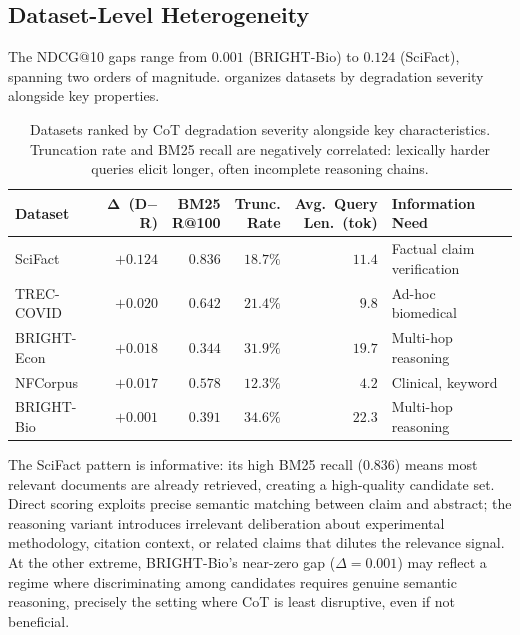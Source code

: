 \documentclass[12pt]{article}
\makeatletter
\newcommand{\ndcg}{NDCG@10}
\newcommand{\CoT}{CoT}
\makeatother
\begin{document}
\subsection{Dataset-Level Heterogeneity}
\label{sec:dataset_heterogeneity}

The \ndcg{} gaps range from $0.001$ (BRIGHT-Bio) to $0.124$ (SciFact), spanning
two orders of magnitude.   organizes datasets
by degradation severity alongside key properties.

\begin{table}[htbp]
\caption{Datasets ranked by \CoT{} degradation severity alongside key
         characteristics.  Truncation rate and BM25 recall are negatively
         correlated: lexically harder queries elicit longer, often incomplete
         reasoning chains.}
\label{tab:dataset_characterization}
\centering
\small
\setlength{\tabcolsep}{6pt}
\renewcommand{\arraystretch}{1.3}
\begin{tabular}{@{}l r r r r l@{}}
\toprule
\textbf{Dataset} &
$\bm{\Delta}$\textbf{~(D$-$R)} &
\makecell{\textbf{BM25}\\\textbf{R@100}} &
\makecell{\textbf{Trunc.}\\\textbf{Rate}} &
\makecell{\textbf{Avg.~Query}\\\textbf{Len.~(tok)}} &
\textbf{Information Need} \\
\midrule
\rowcolor{rowgray}
SciFact     & $+0.124$ & $0.836$ & $18.7\%$ & $11.4$ & Factual claim verification \\
TREC-COVID  & $+0.020$ & $0.642$ & $21.4\%$ & $9.8$  & Ad-hoc biomedical \\
\rowcolor{rowgray}
BRIGHT-Econ & $+0.018$ & $0.344$ & $31.9\%$ & $19.7$ & Multi-hop reasoning \\
NFCorpus    & $+0.017$ & $0.578$ & $12.3\%$ & $4.2$  & Clinical, keyword \\
\rowcolor{rowgray}
BRIGHT-Bio  & $+0.001$ & $0.391$ & $34.6\%$ & $22.3$ & Multi-hop reasoning \\
\bottomrule
\end{tabular}
\end{table}

The SciFact pattern is informative: its high BM25 recall ($0.836$) means most
relevant documents are already retrieved, creating a high-quality candidate set.
Direct scoring exploits precise semantic matching between claim and abstract;
the reasoning variant introduces irrelevant deliberation about experimental
methodology, citation context, or related claims that dilutes the relevance
signal.  At the other extreme, BRIGHT-Bio's near-zero gap ($\Delta=0.001$) may
reflect a regime where discriminating among candidates requires genuine semantic
reasoning, precisely the setting where \CoT{} is least disruptive, even if not
beneficial.
\end{document}
